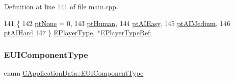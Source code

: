 Definition at line 141 of file main.\+cpp.


\begin{DoxyCode}
141                     \{
142             \hyperlink{classCApplicationData_ae04b6b340297311972ce1e955196fcaaa091de1adaa447ed15f9f6bb25f0880f7}{ptNone} = 0,
143             \hyperlink{classCApplicationData_ae04b6b340297311972ce1e955196fcaaaf06f9bc64db8860bc03ecc330b11f234}{ptHuman},
144             \hyperlink{classCApplicationData_ae04b6b340297311972ce1e955196fcaaa94da5a073589347212dc8f08c02a17a5}{ptAIEasy},
145             \hyperlink{classCApplicationData_ae04b6b340297311972ce1e955196fcaaa212e16bbc4488c26c54f3b37ac3a336e}{ptAIMedium},
146             \hyperlink{classCApplicationData_ae04b6b340297311972ce1e955196fcaaa421a2ddbb6243ca4d7e886bcbf490af5}{ptAIHard}
147         \} \hyperlink{classCApplicationData_ae04b6b340297311972ce1e955196fcaa}{EPlayerType}, *\hyperlink{classCApplicationData_a26f033ac5752403a511af304618f90fd}{EPlayerTypeRef};
\end{DoxyCode}
\hypertarget{classCApplicationData_ad49585591fc53bff1c89bc512170280d}{}\label{classCApplicationData_ad49585591fc53bff1c89bc512170280d} 
\subsubsection{\texorpdfstring{E\+U\+I\+Component\+Type}{EUIComponentType}}
{\footnotesize\ttfamily enum \hyperlink{classCApplicationData_ad49585591fc53bff1c89bc512170280d}{C\+Application\+Data\+::\+E\+U\+I\+Component\+Type}\hspace{0.3cm}{\ttfamily [protected]}}

